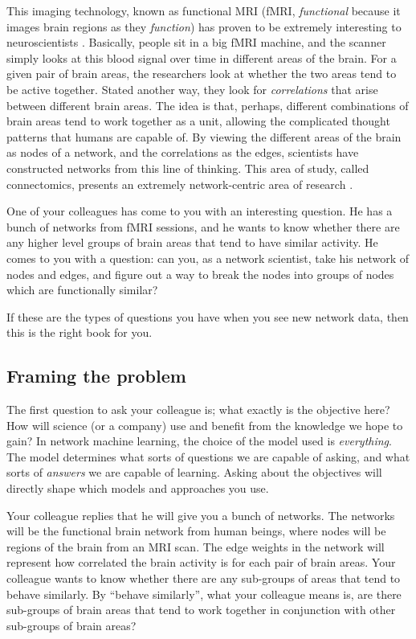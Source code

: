 This imaging technology, known as functional MRI (fMRI, \emph{functional} because it images brain regions as they \emph{function}) has proven to be extremely interesting to neuroscientists \cite{Poldrack2011Aug}. Basically, people sit in a big fMRI machine, and the scanner simply looks at this blood signal over time in different areas of the brain. For a given pair of brain areas, the researchers look at whether the two areas tend to be active together. Stated another way, they look for \emph{correlations} that arise between different brain areas. The idea is that, perhaps, different combinations of brain areas tend to work together as a unit, allowing the complicated thought patterns that humans are capable of. By viewing the different areas of the brain as nodes of a network, and the correlations as the edges, scientists have constructed networks from this line of thinking. This area of study, called connectomics, presents an extremely network-centric area of research \cite{Munsell2018Sep}.

One of your colleagues has come to you with an interesting question. He has a bunch of networks from fMRI sessions, and he wants to know whether there are any higher level groups of brain areas that tend to have similar activity. He comes to you with a question: can you, as a network scientist, take his network of nodes and edges, and figure out a way to break the nodes into groups of nodes which are functionally similar?

If these are the types of questions you have when you see new network data, then this is the right book for you. 

\subsection{Framing the problem}

The first question to ask your colleague is; what exactly is the objective here? How will science (or a company) use and benefit from the knowledge we hope to gain? In network machine learning, the choice of the model used is \emph{everything}. The model determines what sorts of questions we are capable of asking, and what sorts of \emph{answers} we are capable of learning. Asking about the objectives will directly shape which models and approaches you use.

Your colleague replies that he will give you a bunch of networks. The networks will be the functional brain network from human beings, where nodes will be regions of the brain from an MRI scan. The edge weights in the network will represent how correlated the brain activity is for each pair of brain areas. Your colleague wants to know whether there are any sub-groups of areas that tend to behave similarly. By ``behave similarly'', what your colleague means is, are there sub-groups of brain areas that tend to work together in conjunction with other sub-groups of brain areas?

